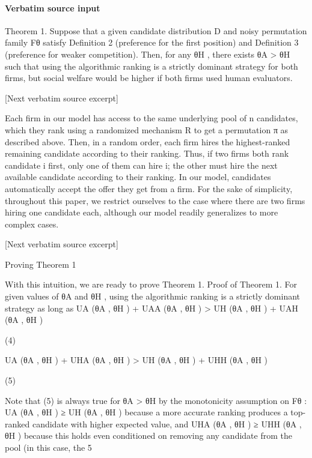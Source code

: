 \documentclass[10pt]{article}
\begin{document}
\paragraph{Verbatim source input}
\begin{ReviewVerbatim}
Theorem 1. Suppose that a given candidate distribution D and noisy permutation family Fθ satisfy Definition 2 (preference for the first position) and Definition 3 (preference for weaker competition).
Then, for any θH , there exists θA > θH such that using the algorithmic ranking is a strictly dominant
strategy for both firms, but social welfare would be higher if both firms used human evaluators.

[Next verbatim source excerpt]

Each firm in our model has access to the same underlying pool of n candidates, which they rank using
a randomized mechanism R to get a permutation π as described above. Then, in a random order, each
firm hires the highest-ranked remaining candidate according to their ranking. Thus, if two firms both rank
candidate i first, only one of them can hire i; the other must hire the next available candidate according to
their ranking. In our model, candidates automatically accept the offer they get from a firm. For the sake
of simplicity, throughout this paper, we restrict ourselves to the case where there are two firms hiring one
candidate each, although our model readily generalizes to more complex cases.

[Next verbatim source excerpt]

Proving Theorem 1

With this intuition, we are ready to prove Theorem 1.
Proof of Theorem 1. For given values of θA and θH , using the algorithmic ranking is a strictly dominant
strategy as long as
UA (θA , θH ) + UAA (θA , θH ) > UH (θA , θH ) + UAH (θA , θH )

(4)

UA (θA , θH ) + UHA (θA , θH ) > UH (θA , θH ) + UHH (θA , θH )

(5)

Note that (5) is always true for θA > θH by the monotonicity assumption on Fθ : UA (θA , θH ) ≥ UH (θA , θH )
because a more accurate ranking produces a top-ranked candidate with higher expected value, and UHA (θA , θH ) ≥
UHH (θA , θH ) because this holds even conditioned on removing any candidate from the pool (in this case, the
5



\end{ReviewVerbatim}
\end{document}
